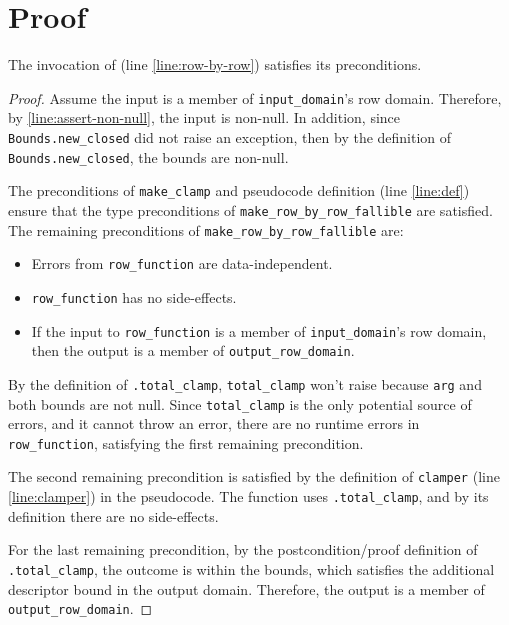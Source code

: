 \documentclass{article}
\begin{document}
\section{Proof} 
 
\begin{lemma} 
    The invocation of  (line \ref{line:row-by-row}) satisfies its preconditions. 
\end{lemma} 
 
\begin{proof} 
    Assume the input is a member of \texttt{input\_domain}'s row domain.  
    Therefore, by \ref{line:assert-non-null}, the input is non-null. 
    In addition, since \texttt{Bounds.new\_closed} did not raise an exception, then by the definition of \texttt{Bounds.new\_closed}, the bounds are non-null. 
    
    \label{lemma:row-by-row-precondition} 
    The preconditions of \texttt{make\_clamp} and pseudocode definition (line \ref{line:def}) ensure that the type preconditions of \texttt{make\_row\_by\_row\_fallible} are satisfied.  
    The remaining preconditions of \texttt{make\_row\_by\_row\_fallible} are: 
    \begin{itemize} 
        \item Errors from \texttt{row\_function} are data-independent.
        \item \texttt{row\_function} has no side-effects.
        \item If the input to \texttt{row\_function} is a member of \texttt{input\_domain}'s row domain, then the output is a member of \texttt{output\_row\_domain}. 
    \end{itemize}
    
    \item By the definition of \texttt{.total\_clamp}, 
    \texttt{total\_clamp} won't raise because \texttt{arg} and both bounds are not null.
    Since \texttt{total\_clamp} is the only potential source of errors, and it cannot throw an error,
    there are no runtime errors in \texttt{row\_function}, satisfying the first remaining precondition.

    The second remaining precondition is satisfied by the definition of \texttt{clamper} (line \ref{line:clamper}) in the pseudocode.
    The function uses \texttt{.total\_clamp}, and by its definition there are no side-effects.
 
    For the last remaining precondition, 
    by the postcondition/proof definition of \texttt{.total\_clamp},
    the outcome is within the bounds, which satisfies the additional descriptor bound in the output domain.
    Therefore, the output is a member of \texttt{output\_row\_domain}. 
\end{proof} 
 
\end{document}
